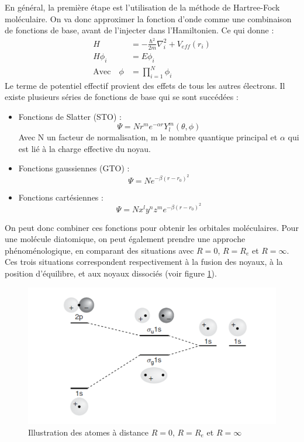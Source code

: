 En général, la première étape est l'utilisation de la méthode de Hartree-Fock moléculaire. On va donc approximer la fonction d'onde comme une combinaison de fonctions de base, avant de l'injecter dans l'Hamiltonien. Ce qui donne :
\begin{equation*}
\begin{split}
    H &= -\frac{\hbar^2}{2m}\nabla^2_i + V_{eff}(r_i)\\
    H\phi_i &= E\phi_i\\
    \textrm{Avec} \quad \phi &= \prod_{i=1}^N\phi_i
\end{split}
\end{equation*}
Le terme de potentiel effectif provient des effets de tous les autres électrons.\newline
Il existe plusieurs séries de fonctions de base qui se sont succédées : \newline
\begin{itemize}
    \item Fonctions de Slatter (STO) :
    \begin{equation*}
        \Psi = Nr^me^{-\alpha r}Y_l^m(\theta,\phi)
    \end{equation*}
    Avec N un facteur de normalisation, m le nombre quantique principal et $\alpha$ qui est lié à la charge effective du noyau.
    \item Fonctions gaussiennes (GTO) :
    \begin{equation*}
        \Psi = Ne^{-\beta(r-r_0)^2}
    \end{equation*}
    \item Fonctions cartésiennes : 
    \begin{equation*}
        \Psi = Nx^ly^nz^me^{-\beta(r-r_0)^2}
    \end{equation*}
\end{itemize}
On peut donc combiner ces fonctions pour obtenir les orbitales moléculaires. \newline
Pour une molécule diatomique, on peut également prendre une approche phénoménologique, en comparant des situations avec $R = 0$, $R = R_e$ et $R = \infty$. Ces trois situations correspondent respectivement à la fusion des noyaux, à la position d'équilibre, et aux noyaux dissociés (voir figure \ref{fig:Dist_mol}). \newline
\begin{figure}
    \centering
    \includegraphics[scale=0.6]{Images3/Distance mol.PNG}
    \caption{Illustration des atomes à distance $R=0$, $R=R_e$ et $R=\infty$}
    \label{fig:Dist_mol}
\end{figure}
